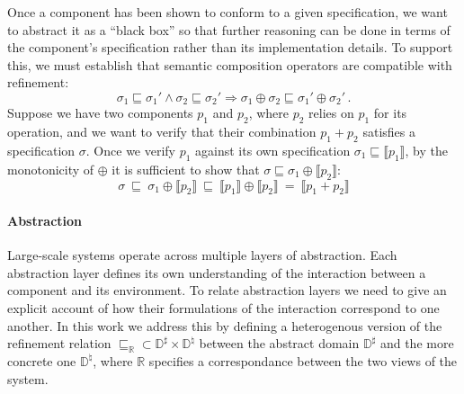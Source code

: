 \documentclass[sigplan,10pt,review,anonymous]{acmart}
\begin{document}
Once a component has been shown to conform to a given specification,
we want to abstract it as a ``black box''
so that further reasoning can be done in terms of
the component's specification rather than its implementation details.
To support this,
we must establish that semantic composition operators
are compatible with refinement:
\[ \sigma_1 \sqsubseteq \sigma_1' \wedge
   \sigma_2 \sqsubseteq \sigma_2' \Rightarrow
   \sigma_1 \oplus \sigma_2 \sqsubseteq \sigma_1' \oplus \sigma_2' \,. \]
Suppose we have two components $p_1$ and $p_2$,
where $p_2$ relies on $p_1$ for its operation,
and we want to verify that their combination $p_1 + p_2$
satisfies a specification $\sigma$.
Once we verify $p_1$ against its own specification
$\sigma_1 \sqsubseteq \llbracket p_1 \rrbracket$,
by the monotonicity of ${\oplus}$ it is sufficient to show that
$\sigma \sqsubseteq \sigma_1 \oplus \llbracket p_2 \rrbracket$:
\[
   \sigma \:\sqsubseteq\:
   \sigma_1 \oplus \llbracket p_2 \rrbracket \:\sqsubseteq\:
   \llbracket p_1 \rrbracket \oplus \llbracket p_2 \rrbracket \:=\:
   \llbracket p_1 + p_2 \rrbracket
\]


\paragraph{Abstraction} %

Large-scale systems operate across multiple layers of abstraction.
Each abstraction layer defines its own understanding of the interaction
between a component and its environment.
To relate abstraction layers we need to give
an explicit account of how their formulations of the interaction
correspond to one another.
In this work we address this by defining a heterogenous version
of the refinement relation
${\sqsubseteq_\mathbb{R}} \subset
 \mathbb{D}^\sharp \times \mathbb{D}^\natural$ between
the abstract domain $\mathbb{D}^\sharp$ and
the more concrete one $\mathbb{D}^\natural$, where
$\mathbb{R}$ specifies a correspondance between
the two views of the system.

\end{document}
